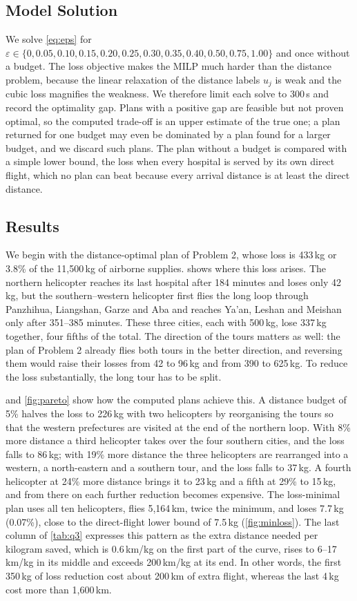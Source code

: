 \documentclass[11pt,a4paper]{article}
\theoremstyle{definition}
\begin{document}
\subsection{Model Solution}
We solve \eqref{eq:eps} for $\varepsilon\in\{0,0.05,0.10,0.15,0.20,0.25,0.30,0.35,0.40,0.50,0.75,1.00\}$ and once without a budget.
The loss objective makes the MILP much harder than the distance problem, because the linear relaxation of the distance labels $u_j$ is weak and the cubic loss magnifies the weakness.
We therefore limit each solve to 300\,s and record the optimality gap.
Plans with a positive gap are feasible but not proven optimal, so the computed trade-off is an upper estimate of the true one; a plan returned for one budget may even be dominated by a plan found for a larger budget, and we discard such plans.
The plan without a budget is compared with a simple lower bound, the loss when every hospital is served by its own direct flight, which no plan can beat because every arrival distance is at least the direct distance.

\subsection{Results}\label{sec:q3-results}
We begin with the distance-optimal plan of Problem 2, whose loss is 433\,kg or 3.8\% of the 11{,}500\,kg of airborne supplies.
 shows where this loss arises.
The northern helicopter reaches its last hospital after 184 minutes and loses only 42\,kg, but the southern--western helicopter first flies the long loop through Panzhihua, Liangshan, Garze and Aba and reaches Ya'an, Leshan and Meishan only after 351--385 minutes.
These three cities, each with 500\,kg, lose 337\,kg together, four fifths of the total.
The direction of the tours matters as well: the plan of Problem 2 already flies both tours in the better direction, and reversing them would raise their losses from 42 to 96\,kg and from 390 to 625\,kg.
To reduce the loss substantially, the long tour has to be split.

 and \cref{fig:pareto} show how the computed plans achieve this.
A distance budget of 5\% halves the loss to 226\,kg with two helicopters by reorganising the tours so that the western prefectures are visited at the end of the northern loop.
With 8\% more distance a third helicopter takes over the four southern cities, and the loss falls to 86\,kg; with 19\% more distance the three helicopters are rearranged into a western, a north-eastern and a southern tour, and the loss falls to 37\,kg.
A fourth helicopter at 24\% more distance brings it to 23\,kg and a fifth at 29\% to 15\,kg, and from there on each further reduction becomes expensive.
The loss-minimal plan uses all ten helicopters, flies 5{,}164\,km, twice the minimum, and loses 7.7\,kg (0.07\%), close to the direct-flight lower bound of 7.5\,kg (\cref{fig:minloss}).
The last column of \cref{tab:q3} expresses this pattern as the extra distance needed per kilogram saved, which is 0.6\,km/kg on the first part of the curve, rises to 6--17\,km/kg in its middle and exceeds 200\,km/kg at its end.
In other words, the first 350\,kg of loss reduction cost about 200\,km of extra flight, whereas the last 4\,kg cost more than 1{,}600\,km.
\end{document}
